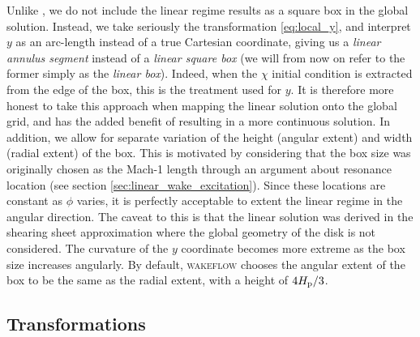 Unlike \citet{bollati2021}, we do not include the linear regime results as a square box in the global solution.
Instead, we take seriously the transformation \ref{eq:local_y}, and interpret $y$ as an arc-length instead of a true Cartesian coordinate, giving us a \textit{linear annulus segment} instead of a \textit{linear square box} (we will from now on refer to the former simply as the \textit{linear box}).
Indeed, when the $\chi$ initial condition is extracted from the edge of the box, this is the treatment used for $y$.
It is therefore more honest to take this approach when mapping the linear solution onto the global grid, and has the added benefit of resulting in a more continuous solution.
In addition, we allow for separate variation of the height (angular extent) and width (radial extent) of the box.
This is motivated by considering that the box size was originally chosen as the Mach-1 length through an argument about resonance location (see section \ref{sec:linear_wake_excitation}).
Since these locations are constant as $\phi$ varies, it is perfectly acceptable to extent the linear regime in the angular direction.
The caveat to this is that the linear solution was derived in the shearing sheet approximation where the global geometry of the disk is not considered.
The curvature of the $y$ coordinate becomes more extreme as the box size increases angularly.
By default, \textsc{wakeflow} chooses the angular extent of the box to be the same as the radial extent, with a height of $4H_{\rm p}/3$.

\subsection{Transformations} \label{sec:transformations}

